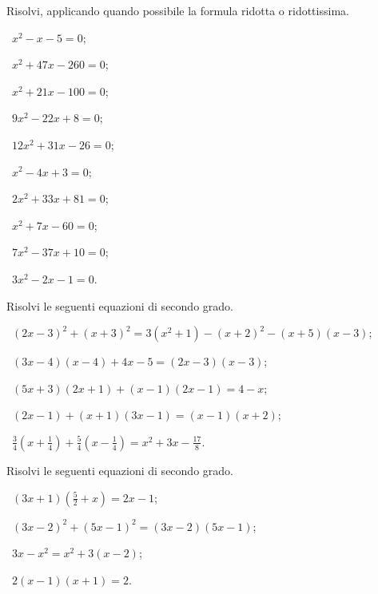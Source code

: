 \begin{esercizio}[\Ast]
\label{ese:3.16} %
Risolvi, applicando quando possibile la formula ridotta o ridottissima.
\begin{multicols}{2}
 \begin{enumeratea}
 \item~$x^{2}- x -5 = 0$;
 \item~$x^{2}+ 47 x-260 = 0$;
 \item~$x^{2}+21 x -100 = 0$;
 \item~$9 x^{2}-22 x + 8 = 0$;
 \item~$12 x^{2} + 31 x -26 = 0$;
 \item~$x^{2}-4 x + 3 = 0$;
 \item~$2 x^{2}+33 x + 81 = 0$;
 \item~$x^{2} + 7 x - 60 = 0$;
 \item~$7 x^{2} - 37 x + 10 = 0$;
 \item~$3 x^{2} -2 x -1 = 0$.
 \end{enumeratea}
 \end{multicols}
\end{esercizio}

\begin{esercizio}[\Ast]
\label{ese:3.17} %
Risolvi le seguenti equazioni di secondo grado.
 \begin{enumeratea}
 \item~$(2 x -3)^{2}+(x+3)^{2}=3\left(x^{2} + 1 \right)-(x+2)^{2}-(x+5)(x-3)$;
 \item~$(3 x-4)(x-4) + 4x-5 = (2 x-3) (x-3)$;
 \item~$(5 x+3)(2x+1) +(x-1)(2x-1) = 4-x$;
 \item~$(2x-1)+(x+1)(3x-1) = (x-1)(x+2)$;
 \item~$\frac{3}{4}\left(x+\frac{1}{4}\right)+\frac{5}{4}\left(x-\frac{1}{4}\right)=x^{2}+3x-\frac{17}{8}$.
 \end{enumeratea}
\end{esercizio}
\pagebreak
\begin{esercizio}[\Ast]
\label{ese:3.18}
Risolvi le seguenti equazioni di secondo grado.
\begin{multicols}{2}
 \begin{enumeratea}
 \item~$(3 x + 1) \left(\frac{5}{2} + x \right) = 2 x-1$;
 \item~$(3 x-2)^{2} + (5 x-1)^{2} = (3 x-2) (5 x-1)$;
 \item~$3 x-x^{2} = x^{2} + 3 (x-2)$;
 \item~$2 (x-1) (x + 1) = 2$.
 \end{enumeratea}
 \end{multicols}
\end{esercizio}

